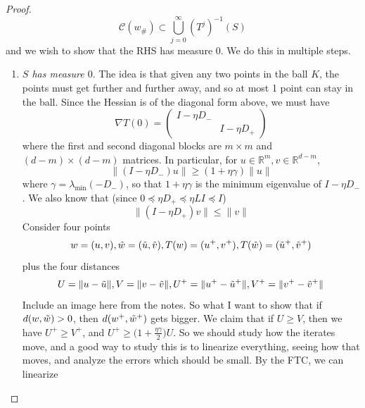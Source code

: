 \begin{proof}
		\begin{equation}
			\mathcal{C}(w_{\#}) \subset \bigcup_{j=0}^\infty (T^j)^{-1} (S)
		\end{equation}
		and we wish to show that the RHS has measure $0$. We do this in multiple steps. 
		\begin{enumerate}
			\item \textit{$S$ has measure $0$}. The idea is that given any two points in the ball $K$, the points must get further and further away, and so at most 1 point can stay in the ball. Since the Hessian is of the diagonal form above, we must have 
				\begin{equation}
					\nabla T(0) = \begin{pmatrix} I - \eta D_- & \\ & I - \eta D_+ \end{pmatrix} 
				\end{equation}
				where the first and second diagonal blocks are $m \times m$ and $(d -m) \times (d - m)$ matrices. In particular, for $u \in \mathbb{R}^m, v \in \mathbb{R}^{d - m}$, 
				\begin{equation}
				  \|(I - \eta D_-) u\| \geq (1 + \eta \gamma) \|u\|
				\end{equation}
				where $\gamma = \lambda_{\min} (-D_-)$, so that $1 + \eta \gamma$ is the minimum eigenvalue of $I - \eta D_-$. We also know that (since $0 \preceq \eta D_+ \preceq \eta L I \preceq I$)
				\begin{equation}
				  \|(I - \eta D_+)v\| \leq \|v\|
				\end{equation}
				Consider four points 
				\begin{equation}
					w = (u, v), \Tilde{w} = (\Tilde{u}, \Tilde{v}), T(w) = (u^+, v^+), T(\Tilde{w}) = (\Tilde{u}^+, \Tilde{v}^+)
				\end{equation}
				plus the four distances 
				\begin{equation}
					U = \|u - \Tilde{u}\|, V = \|v - \Tilde{v}\|, U^+ = \|u^+ - \Tilde{u}^+\|, V^+ = \|v^+ - \Tilde{v}^+\|
				\end{equation}
				Include an image here from the notes. So what I want to show that if $d(w, \Tilde{w}) > 0$, then $d(w^+, \Tilde{w}^+)$ gets bigger. We claim that if $U \geq V$, then we have $U^+ \geq V^+$, and $U^+ \geq \big( 1 + \frac{\eta \gamma}{2} \big) U$. So we should study how the iterates move, and a good way to study this is to linearize everything, seeing how that moves, and analyze the errors which should be small. By the FTC, we can linearize
				\begin{equation}

\end{equation}
\end{enumerate}
\end{proof}
